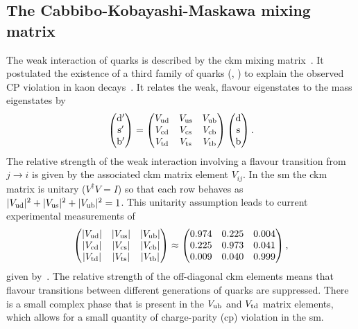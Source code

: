 \subsection{The Cabbibo-Kobayashi-Maskawa mixing matrix} %
\label{sub:the_cabbibo_kobayashi_maskawa_mixing_matrix}
The weak interaction of quarks is described by the \acrfull{ckm} mixing matrix~\cite{Th:CKM1, Th:CKM2}.
It postulated the existence of a third family of quarks (\tquark{}, \bquark{}) to explain the observed CP violation in kaon decays~\cite{Th:CKM2}.
It relates the weak, flavour eigenstates to the mass eigenstates by
\begin{equation*}
\begin{pmatrix}
\mathrm{d}' \\
\mathrm{s}' \\
\mathrm{b}'
\end{pmatrix}
=
\begin{pmatrix}
V_{\mathrm{u}\mathrm{d}} & V_{\mathrm{u}\mathrm{s}} & V_{\mathrm{u}\mathrm{b}} \\
V_{\mathrm{c}\mathrm{d}} & V_{\mathrm{c}\mathrm{s}} & V_{\mathrm{c}\mathrm{b}} \\
V_{\mathrm{t}\mathrm{d}} & V_{\mathrm{t}\mathrm{s}} & V_{\mathrm{t}\mathrm{b}}
\end{pmatrix}
\begin{pmatrix}
\mathrm{d} \\
\mathrm{s} \\
\mathrm{b}
\end{pmatrix}.
\end{equation*}
The relative strength of the weak interaction involving a flavour transition from $j\rightarrow i$ is given by the associated \acrshort{ckm} matrix element $V_{ij}$.
In the \acrshort{sm} the \acrshort{ckm} matrix is unitary ($V^{\dag}V=I$) so that each row behaves as $\lvert V_{\mathrm{u}\mathrm{d}} \rvert^2 + \lvert V_{\mathrm{u}\mathrm{s}} \rvert^2 + \lvert V_{\mathrm{u}\mathrm{b}} \rvert^2 = 1$.
This unitarity assumption leads to current experimental measurements of
\begin{equation*}
\begin{pmatrix}
\lvert V_{\mathrm{u}\mathrm{d}} \rvert & \lvert V_{\mathrm{u}\mathrm{s}} \rvert & \lvert V_{\mathrm{u}\mathrm{b}} \rvert \\
\lvert V_{\mathrm{c}\mathrm{d}} \rvert & \lvert V_{\mathrm{c}\mathrm{s}} \rvert & \lvert V_{\mathrm{c}\mathrm{b}} \rvert \\
\lvert V_{\mathrm{t}\mathrm{d}} \rvert & \lvert V_{\mathrm{t}\mathrm{s}} \rvert & \lvert V_{\mathrm{t}\mathrm{b}} \rvert
\end{pmatrix}
\approx
\begin{pmatrix}
0.974 & 0.225 & 0.004 \\
0.225 & 0.973 & 0.041 \\
0.009 & 0.040 & 0.999
\end{pmatrix},
\end{equation*}
given by~\cite{PDG}.
The relative strength of the off-diagonal \acrshort{ckm} elements means that flavour transitions between different generations of quarks are suppressed.
There is a small complex phase that is present in the $V_{\mathrm{u}\mathrm{b}}$ and $V_{\mathrm{t}\mathrm{d}}$ matrix elements, which allows for a small quantity of charge-parity (\acrshort{cp}) violation in the \acrshort{sm}.


